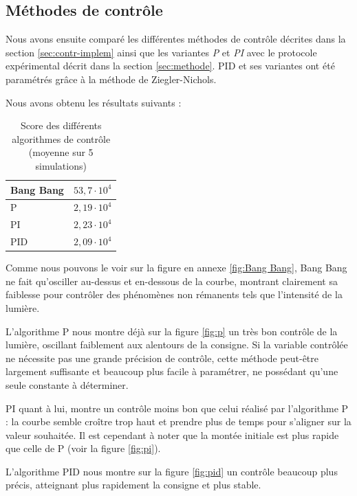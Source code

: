 \documentclass[a4paper,10pt]{report}
\begin{document}
\subsection{Méthodes de contrôle}

Nous avons ensuite comparé les différentes méthodes de contrôle décrites dans la section \ref{sec:contr-implem} ainsi que les variantes \textit{P} et \textit{PI} avec le protocole expérimental décrit dans la section \ref{sec:methode}.
PID et ses variantes ont été paramétrés grâce à la méthode de Ziegler-Nichols.

Nous avons obtenu les résultats suivants :

\begin{table}[H]
\begin{center}
    \begin{tabular}{|l|l|}
        \hline
        Bang Bang & $53,7 \cdot 10^4$ \\ \hline
        P         & $2,19 \cdot 10^4$ \\ \hline
        PI        & $2,23 \cdot 10^4$ \\ \hline
        PID       & $2,09 \cdot 10^4$ \\
        \hline
    \end{tabular}
\end{center}
\caption{Score des différents algorithmes de contrôle (moyenne sur 5 simulations)}
\end{table}


Comme nous pouvons le voir sur la figure en annexe \ref{fig:Bang Bang}, Bang Bang ne fait qu'osciller au-dessus et en-dessous de la courbe, montrant clairement sa faiblesse pour contrôler des phénomènes non rémanents tels que l'intensité de la lumière.

L'algorithme P nous montre déjà sur la figure \ref{fig:p} un très bon contrôle de la lumière, oscillant faiblement aux alentours de la consigne.
Si la variable contrôlée ne nécessite pas une grande précision de contrôle, cette méthode peut-être largement suffisante et beaucoup plus facile à paramétrer, ne possédant qu'une seule constante à déterminer.

PI quant à lui, montre un contrôle moins bon que celui réalisé par l'algorithme P :
la courbe semble croître trop haut et prendre plus de temps pour s'aligner sur la valeur souhaitée.
Il est cependant à noter que la montée initiale est plus rapide que celle de P (voir la figure \ref{fig:pi}).

L'algorithme PID nous montre sur la figure \ref{fig:pid} un contrôle beaucoup plus précis, atteignant plus rapidement la consigne et plus stable.
\end{document}
